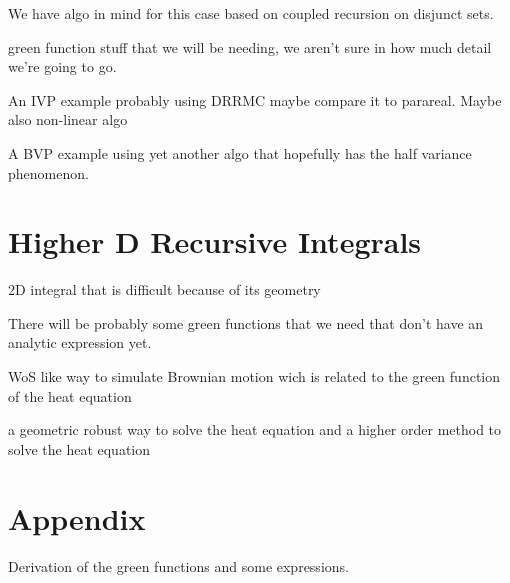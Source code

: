 \documentclass[12pt]{article}
\begin{document}
\begin{example}
    We have algo in mind for this case based on coupled recursion on disjunct sets.
\end{example}

\begin{theorem}
    green function stuff that we will be needing, we aren't sure in how much detail we're going to go.
\end{theorem}

\begin{example}[IVP]
    An IVP example probably using DRRMC maybe compare it to parareal. Maybe also non-linear algo
\end{example}

\begin{example}[BVP]
    A BVP example using yet another algo that hopefully has the half variance phenomenon.
\end{example}

\section{Higher D Recursive Integrals}

\begin{example}
    $2$D integral that is difficult because of its geometry
\end{example}

\begin{example}
    There will be probably some green functions that we need
    that don't have an analytic expression yet.
\end{example}

\begin{example}
    WoS like way to simulate Brownian motion wich is related to the green function
    of the heat equation
\end{example}

\begin{example}
    a geometric robust way to solve the heat equation and a higher order method to solve
    the heat equation
\end{example}

\section{Appendix}
Derivation of the green functions and some expressions.
\end{document}
